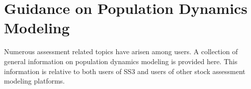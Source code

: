 
\section{Guidance on Population Dynamics Modeling}

Numerous assessment related topics have arisen among users. A collection of general information on population dynamics modeling is provided here. This information is relative to both users of SS3 and users of other stock assessment modeling platforms.





\pagebreak

